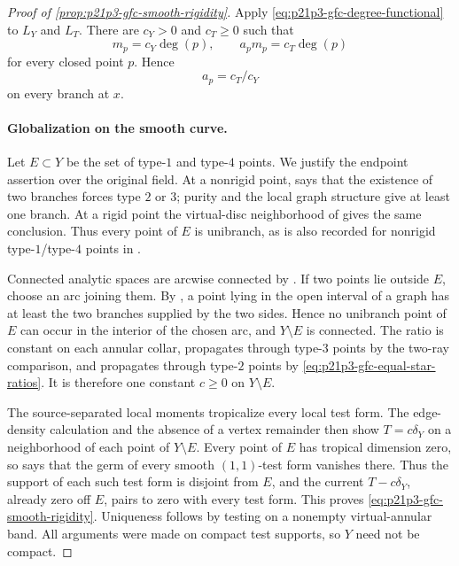 \begin{proof}[Proof of \cref{prop:p21p3-gfc-smooth-rigidity}]
Apply \eqref{eq:p21p3-gfc-degree-functional} to $L_Y$ and $L_T$.
There are $c_Y>0$ and $c_T\geq0$ such that
\[
                  m_p=c_Y\deg(p),
 \qquad
                  a_pm_p=c_T\deg(p)
\]
for every closed point $p$.  Hence
\begin{equation}
\label{eq:p21p3-gfc-equal-star-ratios}
                              a_p=c_T/c_Y
\end{equation}
on every branch at $x$.

\paragraph{Globalization on the smooth curve.}
Let $E\subset Y$ be the set of type-$1$ and type-$4$ points.  We justify
the endpoint assertion over the original field.  At a nonrigid point,
\cite[Theorem~4.2.5]{Ducros24CurveStructure} says that the existence of
two branches forces type $2$ or $3$; purity and the local graph structure
give at least one branch.  At a rigid point the virtual-disc neighborhood
of \cite[Theorem~4.5.4 and \S4.5.4.1]{Ducros24CurveStructure} gives the
same conclusion.  Thus every point of $E$ is unibranch, as is also
recorded for nonrigid type-$1$/type-$4$ points in
\cite[\S4.5.19.1]{Ducros24CurveStructure}.

Connected analytic spaces are arcwise connected by
\cite[\S12.1.12]{CLD25}.  If two points lie outside $E$, choose an arc
joining them.  By \cite[\S1.3.12]{Ducros24CurveStructure}, a point lying
in the open interval of a graph has at least the two branches supplied by
the two sides.  Hence no unibranch point of $E$ can occur in the interior
of the chosen arc, and $Y\setminus E$ is connected.  The ratio is
constant on each annular collar, propagates through type-$3$ points by
the two-ray comparison, and propagates through type-$2$ points by
\eqref{eq:p21p3-gfc-equal-star-ratios}.  It is therefore one constant
$c\geq0$ on $Y\setminus E$.

The source-separated local moments tropicalize every local test form.
The edge-density calculation and the absence of a vertex remainder then
show $T=c\delta_Y$ on a neighborhood of each point of $Y\setminus E$.
Every point of $E$ has tropical dimension zero, so
\cite[Proposition~3.3.6]{CLD25} says that the germ of every smooth
$(1,1)$-test form vanishes there.  Thus the support of each such test
form is disjoint from $E$, and the current $T-c\delta_Y$, already zero
off $E$, pairs to zero with every test form.  This proves
\eqref{eq:p21p3-gfc-smooth-rigidity}.  Uniqueness follows by testing on a
nonempty virtual-annular band.  All arguments were made on compact test
supports, so $Y$ need not be compact.
\end{proof}

